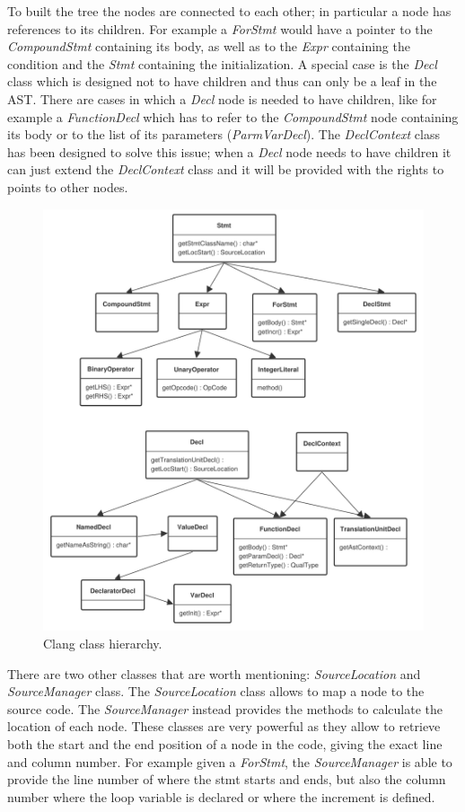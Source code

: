 \documentclass[a4paper,12pt,oneside]{book}
\begin{document}
To built the tree the nodes are connected to each other; in particular a node has references to its children. For example a \emph{ForStmt} would have a pointer to the \emph{CompoundStmt} containing its body, as well as to the \emph{Expr} containing the condition and the \emph{Stmt} containing the initialization. A special case is the \emph{Decl} class which is designed not to have children and thus can only be a leaf in the AST. There are cases in which a \emph{Decl} node is needed to have children, like for example a \emph{FunctionDecl} which has to refer to the \emph{CompoundStmt} node containing its body or to the list of its parameters (\emph{ParmVarDecl}). The \emph{DeclContext} class has been designed to solve this issue; when a \emph{Decl} node needs to have children it can just extend the \emph{DeclContext} class and it will be provided with the rights to points to other nodes. 

\begin{figure}[H]
\centering
\includegraphics[scale=0.6]{clang_classes.pdf}
\caption{Clang class hierarchy.}
\end{figure}

There are two other classes that are worth mentioning: \emph{SourceLocation} and \emph{SourceManager} class. The \emph{SourceLocation} class allows to map a node to the source code. The \emph{SourceManager} instead provides the methods to calculate the location of each node. These classes are very powerful as they allow to retrieve both the start and the end position of a node in the code, giving the exact line and column number. For example given a \emph{ForStmt}, the \emph{SourceManager} is able to provide the line number of where the stmt starts and ends, but also the column number where the loop variable is declared or where the increment is defined.
\end{document}
